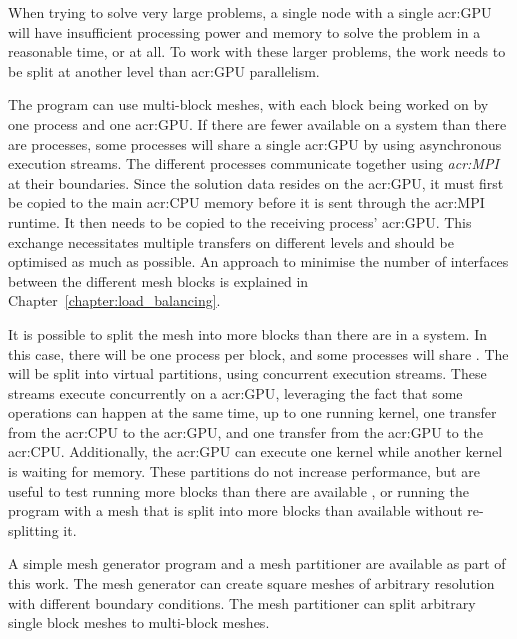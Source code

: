 When trying to solve very large problems, a single node with a single \acrshort{acr:GPU} will have
insufficient processing power and memory to solve the problem in a reasonable time, or at all. To
work with these larger problems, the work needs to be split at another level than \acrshort{acr:GPU}
parallelism.  

The program can use multi-block meshes, with each block being worked on by one process and one
\acrshort{acr:GPU}. If there are fewer  available on a system than there are
processes, some processes will share a single \acrshort{acr:GPU} by using asynchronous execution
streams. The different processes communicate together using \textit{\acrfull{acr:MPI}} at their
boundaries. Since the solution data resides on the \acrshort{acr:GPU}, it must first be copied to
the main \acrshort{acr:CPU} memory before it is sent through the \acrshort{acr:MPI} runtime. It then
needs to be copied to the receiving process' \acrshort{acr:GPU}. This exchange necessitates multiple
transfers on different levels and should be optimised as much as possible. An approach to minimise
the number of interfaces between the different mesh blocks is explained in
Chapter~\ref{chapter:load_balancing}. 

It is possible to split the mesh into more blocks than there are  in a system.
In this case, there will be one process per block, and some processes will share
. The  will be split into virtual partitions, using
concurrent execution streams. These streams execute concurrently on a \acrshort{acr:GPU}, leveraging
the fact that some operations can happen at the same time, up to one running kernel, one transfer
from the \acrshort{acr:CPU} to the \acrshort{acr:GPU}, and one transfer from the \acrshort{acr:GPU}
to the \acrshort{acr:CPU}. Additionally, the \acrshort{acr:GPU} can execute one kernel while another
kernel is waiting for memory. These partitions do not increase performance, but are useful to test
running more blocks than there are available , or running the program with a
mesh that is split into more blocks than available  without re-splitting it.

A simple mesh generator program and a mesh partitioner are available as part of this work. The mesh
generator can create square meshes of arbitrary resolution with different boundary conditions. The
mesh partitioner can split arbitrary single block meshes to multi-block meshes.

